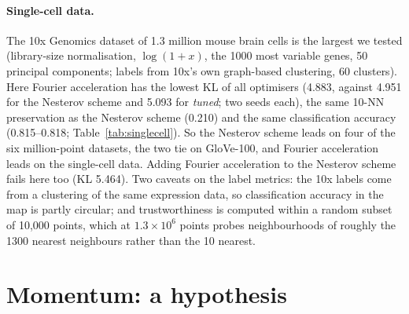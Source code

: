\documentclass[11pt]{article}
\begin{document}
\paragraph{Single-cell data.} The 10x Genomics dataset of 1.3 million mouse brain cells \citep{10x2017neurons} is
the largest we tested (library-size normalisation, $\log(1+x)$, the 1000 most variable genes, 50 principal
components; labels from 10x's own graph-based clustering, 60 clusters). Here Fourier acceleration has the lowest
KL of all optimisers (4.883, against 4.951 for the Nesterov scheme and 5.093 for \emph{tuned}; two seeds each), the
same 10-NN preservation as the Nesterov scheme (0.210) and the same classification accuracy (0.815--0.818;
Table~\ref{tab:singlecell}). So the Nesterov scheme leads on four of the six million-point datasets, the two tie on
GloVe-100, and Fourier acceleration leads on the single-cell data. Adding Fourier acceleration to the Nesterov scheme
fails here too (KL 5.464). Two caveats on the label metrics: the 10x labels come from a clustering of the same
expression data, so classification accuracy in the map is partly circular; and trustworthiness is computed within a
random subset of 10{,}000 points, which at $1.3\times10^6$ points probes neighbourhoods of roughly the 1300 nearest
neighbours rather than the 10 nearest.
\begin{table}[t]\centering\small\resizebox{0.9\linewidth}{!}{}
\caption{10x Genomics 1.3M mouse brain cells (PCA-50): medians of two seeds; columns as in
Table~\ref{tab:labelled}.}\label{tab:singlecell}\end{table}

\section{Momentum: a hypothesis}\label{sec:momentum}
\end{document}
